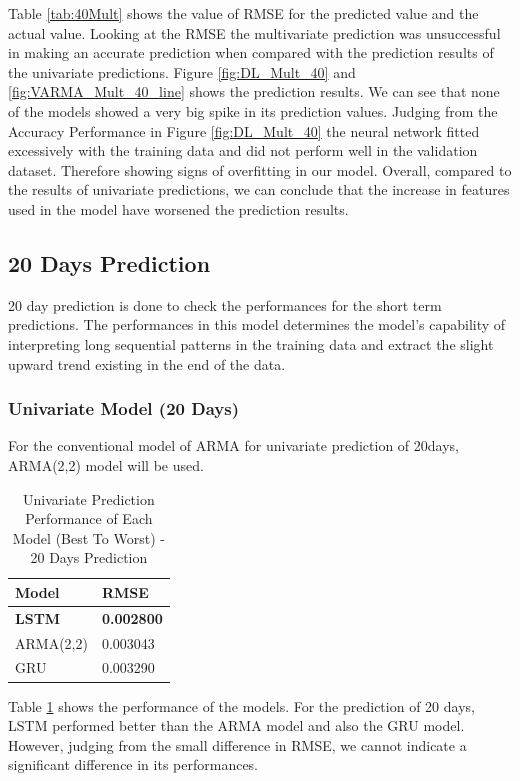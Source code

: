 Table \ref{tab:40Mult} shows the value of RMSE for the predicted value and the actual value. Looking at the RMSE the multivariate prediction was unsuccessful in making an accurate prediction when compared with the prediction results of the univariate predictions. Figure \ref{fig:DL_Mult_40} and  \ref{fig:VARMA_Mult_40_line} shows the prediction results. We can see that none of the models showed a very big spike in its prediction values. Judging from the Accuracy Performance in Figure \ref{fig:DL_Mult_40} the neural network fitted excessively with the training data and did not perform well in the validation dataset. Therefore showing signs of overfitting in our model. Overall, compared to the results of univariate predictions, we can conclude that the increase in features used in the model have worsened the prediction results. 

\subsection{20 Days Prediction}
20 day prediction is done to check the performances for the short term predictions. The performances in this model determines the model's capability of interpreting long sequential patterns in the training data and extract the slight upward trend existing in the end of the data. 
\subsubsection{Univariate Model (20 Days)}
For the conventional model of ARMA for univariate prediction of 20days, ARMA(2,2) model will be used. 
\begin{table}[h]
\caption{Univariate Prediction Performance of Each Model (Best To Worst) - 20 Days Prediction}
    \label{tab:20Uni}
    \centering
    \begin{tabular}{ |p{3cm}||p{3cm}| }
        \hline
         Model &  RMSE\\
        \hline
        \textbf{LSTM}  & \textbf{0.002800}\\
        ARMA(2,2) & 0.003043\\
        GRU  & 0.003290\\
    \hline
    \end{tabular}
\end{table}

Table \ref{tab:20Uni} shows the performance of the models. For the prediction of 20 days, LSTM performed better than the ARMA model and also the GRU model. However, judging from the small difference in RMSE, we cannot indicate a significant difference in its performances. 

